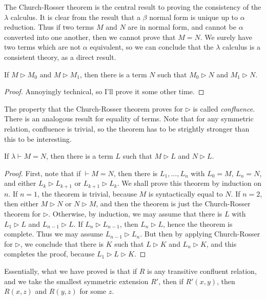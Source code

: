 The Church-Rosser theorem is the central result to proving the consistency of the $\lambda$ calculus. It is clear from the result that a $\beta$ normal form is unique up to $\alpha$ reduction. Thus if two terms $M$ and $N$ are in normal form, and cannot be $\alpha$ converted into one another, then we cannot prove that $M = N$. We surely have two terms which are not $\alpha$ equivalent, so we can conclude that the $\lambda$ calculus is a consistent theory, as a direct result.

\begin{theorem}
    If $M \rhd M_0$ and $M \rhd M_1$, then there is a term $N$ such that $M_0 \rhd N$ and $M_1 \rhd N$.
\end{theorem}
\begin{proof}
    Annoyingly technical, so I'll prove it some other time.
\end{proof}

The property that the Church-Rosser theorem proves for $\rhd$ is called \emph{confluence}. There is an analogous result for equality of terms. Note that for any symmetric relation, confluence is trivial, so the theorem has to be strightly stronger than this to be interesting.

\begin{theorem}
    If $\lambda \vdash M = N$, then there is a term $L$ such that $M \rhd L$ and $N \rhd L$.
\end{theorem}
\begin{proof}
    First, note that if $\vdash M = N$, then there is $L_1, \dots, L_n$ with $L_0 = M$, $L_n = N$, and either $L_k \rhd L_{k+1}$ or $L_{k+1} \rhd L_k$. We shall prove this theorem by induction on $n$. If $n = 1$, the theorem is trivial, because $M$ is syntactically equal to $N$. If $n = 2$, then either $M \rhd N$ or $N \rhd M$, and then the theorem is just the Church-Rosser theorem for $\rhd$. Otherwise, by induction, we may assume that there is $L$ with $L_1 \rhd L$ and $L_{n-1} \rhd L$. If $L_n \rhd L_{n-1}$, then $L_n \rhd L$, hence the theorem is complete. Thus we may assume $L_{n-1} \rhd L_n$. But then by applying Church-Rosser for $\rhd$, we conclude that there is $K$ such that $L \rhd K$ and $L_n \rhd K$, and this completes the proof, because $L_1 \rhd L \rhd K$.
\end{proof}

Essentially, what we have proved is that if $R$ is any transitive confluent relation, and we take the smallest symmetric extension $R'$, then if $R'(x,y)$, then $R(x,z)$ and $R(y,z)$ for some $z$.

